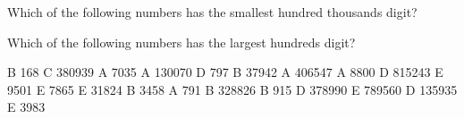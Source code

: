 \documentclass[10pt]{exam}
\begin{document}
\begin{multicols*}{2}
\begin{questions}
\begin{oneparchoices}
\end{oneparchoices}
\question Which of the following numbers has the smallest hundred thousands digit?

\begin{oneparchoices}
\end{oneparchoices}
\question Which of the following numbers has the largest hundreds digit?

\begin{oneparchoices}
\end{oneparchoices}
\question B 168
\question C 380939
\question A 7035
\question A 130070
\question D 797
\question B 37942
\question A 406547
\question A 8800
\question D 815243
\question E 9501
\question E 7865
\question E 31824
\question B 3458
\question A 791
\question B 328826
\question B 915
\question D 378990
\question E 789560
\question D 135935
\question E 3983
\end{questions}
\end{multicols*}
\end{document}
